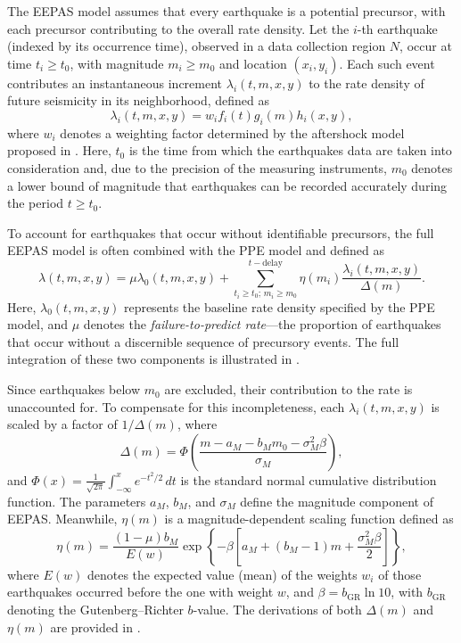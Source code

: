 \documentclass[extra,mreferee]{gji}
\theoremstyle{lemma}
\begin{document}

The EEPAS model assumes that every earthquake is a potential precursor, with each precursor contributing to the overall rate density. Let the $i$-th earthquake (indexed by its occurrence time), observed in a data collection region $N$, occur at time $t_i \geq t_0$, with magnitude $m_i \geq m_0$ and location $(x_i, y_i)$. Each such event contributes an instantaneous increment $\lambda_i(t,m,x,y)$ to the rate density of future seismicity in its neighborhood, defined as
\begin{equation}\label{li}
    \lambda_i(t,m,x,y) = w_i f_i(t) g_i(m) h_i(x,y),
\end{equation}
where $w_i$ denotes a weighting factor determined by the aftershock model proposed in \cite{Rhoades}. Here, $t_0$ is the time from which the earthquakes data are taken into consideration and, due to the precision of the measuring instruments, $m_0$ denotes a lower bound of magnitude that earthquakes can be recorded accurately during the period $t\geq t_0$.

To account for earthquakes that occur without identifiable precursors, the full EEPAS model is often combined with the PPE model and defined as
\begin{equation}\label{ltmxy}
    \lambda(t,m,x,y) = \mu \lambda_0(t,m,x,y) + \sum_{t_i \geq t_0;\, m_i \geq m_0}^{t - \mathrm{delay}} \eta(m_i) \frac{\lambda_i(t,m,x,y)}{\Delta(m)}.
\end{equation}
Here, $\lambda_0(t,m,x,y)$ represents the baseline rate density specified by the PPE model, and $\mu$ denotes the \textit{failure-to-predict rate}—the proportion of earthquakes that occur without a discernible sequence of precursory events. The full integration of these two components is illustrated in .

Since earthquakes below $m_0$ are excluded, their contribution to the rate is unaccounted for. To compensate for this incompleteness, each $\lambda_i(t,m,x,y)$ is scaled by a factor of $1/\Delta(m)$, where
\begin{equation*}
\Delta(m) = \Phi\!\left(\frac{m - a_M - b_M m_0 - \sigma_M^2 \beta}{\sigma_M}\right),
\end{equation*}
and $\Phi(x) = \frac{1}{\sqrt{2\pi}} \int_{-\infty}^x e^{-t^2/2}\,dt$ is the standard normal cumulative distribution function. The parameters $a_M$, $b_M$, and $\sigma_M$ define the magnitude component of EEPAS. Meanwhile, $\eta(m)$ is a magnitude-dependent scaling function defined as
\begin{equation}\label{emi}
    \eta(m) = \frac{(1 - \mu) b_M}{E(w)} \exp\!\left\{ -\beta \left[ a_M + (b_M - 1)m + \frac{\sigma_M^2 \beta}{2} \right] \right\},
\end{equation}
where $E(w)$ denotes the expected value (mean) of the weights $w_i$ of those earthquakes occurred before the one with weight $w$, and $\beta = b_{\mathrm{GR}} \ln 10$, with $b_{\mathrm{GR}}$ denoting the Gutenberg–Richter $b$-value. The derivations of both $\Delta(m)$ and $\eta(m)$ are provided in .
\end{document}
